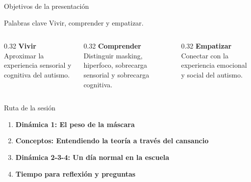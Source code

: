 \begin{frame}{Objetivos de la presentación}
  \begin{block}{Palabras clave}
    Vivir, comprender y empatizar.
  \end{block}
  \vspace{0.4cm}
  \begin{columns}[T]
    \begin{column}{0.32\textwidth}
      \centering
      {\color{ColorPrincipal}\Large\textbf{Vivir}}\\[0.1cm]
      {\small Aproximar la experiencia sensorial y cognitiva del autismo.}
    \end{column}
    \begin{column}{0.32\textwidth}
      \centering
      {\color{ColorPrincipal}\Large\textbf{Comprender}}\\[0.1cm]
      {\small Distinguir masking, hiperfoco, sobrecarga sensorial y sobrecarga cognitiva.}
    \end{column}
    \begin{column}{0.32\textwidth}
      \centering
      {\color{ColorPrincipal}\Large\textbf{Empatizar}}\\[0.1cm]
      {\small Conectar con la experiencia emocional y social del autismo.}
    \end{column}
  \end{columns}
\end{frame}

\begin{frame}{Ruta de la sesión}
  \vfill
  \begin{enumerate}
    \setlength{\itemsep}{0.5cm}
    \item \textbf{Dinámica 1: El peso de la máscara}
    \item \textbf{Conceptos: Entendiendo la teoría a través del cansancio}
    \item \textbf{Dinámica 2-3-4: Un día normal en la escuela}
    \item \textbf{Tiempo para reflexión y preguntas}
  \end{enumerate}
  \vfill
\end{frame}
